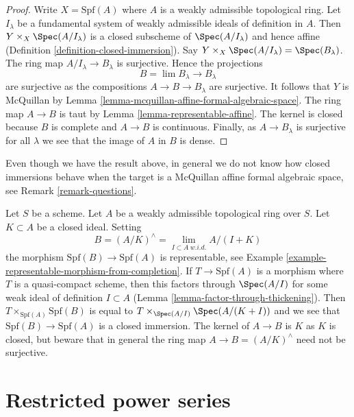 \begin{proof}
Write $X = \text{Spf}(A)$ where $A$ is a weakly admissible topological ring.
Let $I_\lambda$ be a fundamental system of weakly admissible ideals
of definition in $A$. Then $Y \times_X \Spec(A/I_\lambda)$ is
a closed subscheme of $\Spec(A/I_\lambda)$
and hence affine (Definition \ref{definition-closed-immersion}).
Say $Y \times_X \Spec(A/I_\lambda) = \Spec(B_\lambda)$.
The ring map $A/I_\lambda \to B_\lambda$
is surjective. Hence the projections
$$
B = \lim B_\lambda \longrightarrow B_\lambda
$$
are surjective as the compositions $A \to B \to B_\lambda$ are surjective.
It follows that $Y$ is McQuillan by
Lemma \ref{lemma-mcquillan-affine-formal-algebraic-space}.
The ring map $A \to B$ is taut by Lemma \ref{lemma-representable-affine}.
The kernel is closed because $B$ is complete and $A \to B$ is
continuous. Finally, as $A \to B_\lambda$ is surjective for all $\lambda$
we see that the image of $A$ in $B$ is dense.
\end{proof}

\noindent
Even though we have the result above, in general we do not know how
closed immersions behave when the target is a
McQuillan affine formal algebraic space, see Remark \ref{remark-questions}.

\begin{example}
\label{example-closed-immersion-from-quotient}
Let $S$ be a scheme. Let $A$ be a weakly admissible topological ring over $S$.
Let $K \subset A$ be a closed ideal. Setting
$$
B = (A/K)^\wedge = \lim_{I \subset A\ w.i.d.} A/(I + K)
$$
the morphism $\text{Spf}(B) \to \text{Spf}(A)$ is representable, see
Example \ref{example-representable-morphism-from-completion}.
If $T \to \text{Spf}(A)$ is a morphism where $T$ is a quasi-compact
scheme, then this factors through $\Spec(A/I)$ for some weak
ideal of definition $I \subset A$ (Lemma \ref{lemma-factor-through-thickening}).
Then $T \times_{\text{Spf}(A)} \text{Spf}(B)$
is equal to $T \times_{\Spec(A/I)} \Spec(A/(K + I))$ and
we see that $\text{Spf}(B) \to \text{Spf}(A)$ is a closed immersion.
The kernel of $A \to B$ is $K$ as $K$ is closed, but
beware that in general the ring map $A \to B = (A/K)^\wedge$
need not be surjective.
\end{example}






\section{Restricted power series}
\label{section-restricted-power-series}


